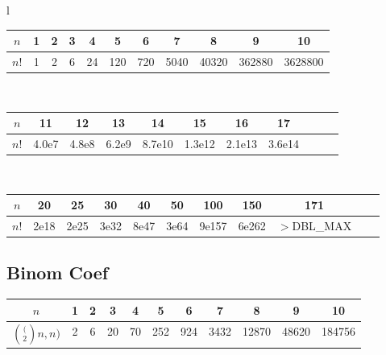 \begin{center}
\begin{tabular}{l}
\begin{tabular}{c|c@{\ }c@{\ }c@{\ }c@{\ }c@{\ }c@{\ }c@{\ }c@{\ }c@{\ }c}
$n$  & 1 & 2 & 3 & 4  & 5   & 6   & 7    & 8     & 9      & 10\\
\hline
$n!$ & 1 & 2 & 6 & 24 & 120 & 720 & 5040 & 40320 & 362880 & 3628800\\
\end{tabular}\\
\begin{tabular}{c|c@{\ }c@{\ }c@{\ }c@{\ }c@{\ }c@{\ }c@{\ }c@{\ }c@{\ }c}
$n$  & 11    & 12    & 13    & 14     & 15     & 16     & 17\\
\hline
$n!$ & 4.0e7 & 4.8e8 & 6.2e9 & 8.7e10 & 1.3e12 & 2.1e13 & 3.6e14\\
\end{tabular}\\
\begin{tabular}{c|c@{\ }c@{\ }c@{\ }c@{\ }c@{\ }c@{\ }c@{\ }c@{\ }c@{\ }c}
$n$  & 20   & 25   & 30   & 40   & 50   & 100   & 150   & 171\\
\hline
$n!$ & 2e18 & 2e25 & 3e32 & 8e47 & 3e64 & 9e157 & 6e262 & \scriptsize{$>$DBL\_MAX}\\
\end{tabular}
\end{tabular}
\end{center}

\subsection{Binom Coef}

\begin{center}
\begin{tabular}{c|c@{\ }c@{\ }c@{\ }c@{\ }c@{\ }c@{\ }c@{\ }c@{\ }c@{\ }c}
$n$            & 1 & 2 & 3 & 4  & 5   & 6   & 7    & 8     & 9     & 10\\
\hline
$\binom(2n,n)$ & 2 & 6 & 20 & 70 & 252 & 924 & 3432 & 12870 & 48620 & 184756\\
\end{tabular}\\
\end{center}
